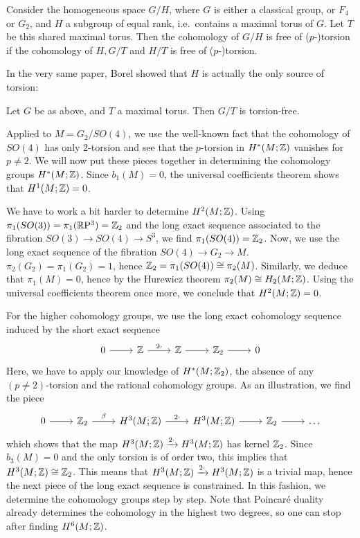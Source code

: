 \begin{thm}
	Consider the homogeneous space $G/H$, where $G$ is either a classical group, or $F_4$ or $G_2$, and $H$ a subgroup of equal rank, i.e.~contains a maximal torus of $G$. Let $T$ be this shared maximal torus. Then the cohomology of $G/H$ is free of ($p$-)torsion if the cohomology of $H,G/T$ and $H/T$ is free of ($p$-)torsion.
\end{thm}

In the very same paper, Borel showed that $H$ is actually the only source of torsion:

\begin{thm}
	Let $G$ be as above, and $T$ a maximal torus. Then $G/T$ is torsion-free.
\end{thm}

Applied to $M=G_2/SO(4)$, we use the well-known fact that the cohomology of $SO(4)$ has only $2$-torsion and see that the $p$-torsion in $H^*(M;\mathbb{Z})$ vanishes for $p\neq 2$. We will now put these pieces together in determining the cohomology groups $H^*(M;\mathbb{Z})$. Since $b_1(M)=0$, the universal coefficients theorem shows that $H^1(M;\mathbb{Z})=0$.

We have to work a bit harder to determine $H^2(M;\mathbb{Z})$. Using $\pi_1(SO(3))=\pi_1(\mathbb{R}\mathrm{P}^3)=\mathbb{Z}_2$ and the long exact sequence associated to the fibration $SO(3)\to SO(4)\to S^3$, we find $\pi_1(SO(4))=\mathbb{Z}_2$. Now, we use the long exact sequence of the fibration $SO(4)\to G_2\to M$. $\pi_2(G_2)=\pi_1(G_2)=1$, hence $\mathbb{Z}_2=\pi_1(SO(4))\cong \pi_2(M)$. Similarly, we deduce that $\pi_1(M)=0$, hence by the Hurewicz theorem $\pi_2(M)\cong H_2(M;\mathbb{Z})$. Using the universal coefficients theorem once more, we conclude that $H^2(M;\mathbb{Z})=0$.

For the higher cohomology groups, we use the long exact cohomology sequence induced by the short exact sequence
\begin{equation*}
	\begin{tikzcd}
		0\ar[r] & \Z \ar[r,"2\cdot"] & \Z \ar[r] & \Z_2 \ar[r] & 0
	\end{tikzcd}
\end{equation*}
Here, we have to apply our knowledge of $H^*(M;\mathbb{Z}_2)$, the absence of any $(p\neq 2)$-torsion and the rational cohomology groups. As an illustration, we find the piece
\begin{equation*}
	\begin{tikzcd}
		0 \ar[r] & \Z_2 \ar[r,"\beta"] & H^3(M;\Z) \ar[r,"2\cdot "] & H^3(M;\Z) \ar[r]
		& \Z_2 \ar[r] & \dots 
	\end{tikzcd}
\end{equation*}
which shows that the map $H^3(M;\mathbb{Z}) \xrightarrow{2\cdot} H^3(M;\mathbb{Z})$ has kernel $\mathbb{Z}_2$. Since $b_3(M)=0$ and the only torsion is of order two, this implies that $H^3(M;\mathbb{Z})\cong \mathbb{Z}_2$. This means that $H^3(M;\mathbb{Z})\xrightarrow{2\cdot} H^3(M;\mathbb{Z})$ is a trivial map, hence the next piece of the long exact sequence is constrained. In this fashion, we determine the cohomology groups step by step. Note that Poincar\'e duality already determines the cohomology in the highest two degrees, so one can stop after finding $H^6(M;\mathbb{Z})$.


